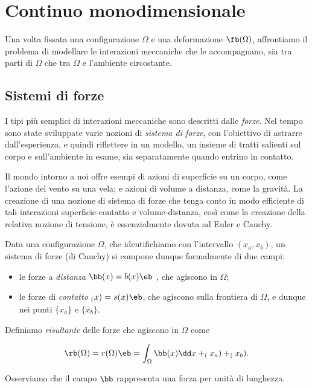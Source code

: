 \chapter{Continuo monodimensionale}



Una volta fissata una configurazione $\Omega$ e una deformazione $\fb(\Omega)$,  affrontiamo il problema di modellare le interazioni meccaniche che le accompagnano, sia tra parti di $\Omega$ che tra $\Omega$ e l'ambiente circostante.  


\section{Sistemi di forze}
I tipi più semplici di interazioni meccaniche sono descritti dalle \textit{forze}. Nel tempo sono state sviluppate varie nozioni di  \textit{sistema di forze}, con l'obiettivo di  astrarre dall'esperienza, e quindi riflettere in un modello, un insieme di tratti salienti  sul corpo e sull'ambiente in esame, sia separatamente quando entrino in contatto. 

Il mondo intorno a noi offre esempi di azioni di superficie su un corpo, come l'azione del vento su una vela; e azioni di volume a distanza, come la gravità. La creazione di una nozione di sistema di forze che tenga conto in modo efficiente di tali interazioni superficie-contatto e volume-distanza, così come la creazione della relativa nozione di tensione, è essenzialmente dovuta ad Euler e Cauchy.

Data una configurazione $\Omega$, che identifichiamo con l'intervallo $(x_a, x_b)$, un sistema di forze (di Cauchy) si compone dunque formalmente di due campi:
\begin{itemize}
	\item le forze a \textit{distanza} $\bb(x)=b(x)\eb$ , che agiscono in $\Omega$;
	\item le forze di \textit{contatto} $\sb(x)=s(x)\eb$, che agiscono sulla frontiera di $\Omega$, e dunque nei punti $\{x_a\}$ e $\{x_b\}$.
\end{itemize}

Definiamo \textit{risultante} delle forze che agiscono in $\Omega$ come
\begin{definition}
	\begin{equation}
\rb(\Omega)=r(\Omega)\eb=\int_{\Omega}\bb(x) \dd x+\sb(x_a)+\sb(x_b).
\end{equation}
\end{definition}
Osserviamo che il campo $\bb$ rappresenta una forza per unità di lunghezza.

